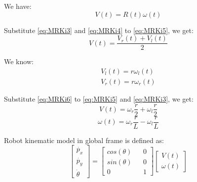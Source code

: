 We have:
\begin{equation} \label{eq:MRKi5}
V(t) = R(t)\omega(t)
\end{equation}

Substitute \ref{eq:MRKi3} and \ref{eq:MRKi4} to \ref{eq:MRKi5}, we get:
\begin{equation}
V(t) = \frac{V_r(t)+V_l(t)}{2}
\end{equation}


We know:
\begin{equation}
\begin{split} \label{eq:MRKi6}
V_l(t) = r\omega_l(t)\\
V_r(t) = r\omega_r(t)
\end{split}
\end{equation}

Substitute \ref{eq:MRKi6} to \ref{eq:MRKi5} and \ref{eq:MRKi3}, we get:
\begin{equation} \label{eq:MRKi_V}
V(t) = \omega_r \frac{r}{2} + \omega_l \frac{r}{2}
\end{equation}
\begin{equation} \label{eq:MRKi_omega}
\omega(t) = \omega_r \frac{r}{L} - \omega_l \frac{r}{L}
\end{equation}


Robot kinematic model in global frame is defined as:
\begin{equation} \label{eq:MRKi7}
\begin{bmatrix}
\Dot{p_x} \\
\Dot{p_y} \\
\Dot{\theta}
\end{bmatrix} = 
\begin{bmatrix}
cos(\theta) && 0\\
sin(\theta) && 0\\
0 && 1
\end{bmatrix}
\begin{bmatrix}
V(t)\\
\omega(t)
\end{bmatrix}
\end{equation}


